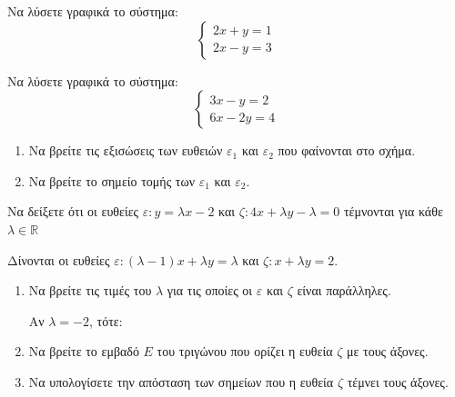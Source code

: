 \documentclass{presentation}
\begin{document}
\begin{askisi}
  Να λύσετε γραφικά το σύστημα: $$\begin{cases} 2x+y=1 \\ 2x-y=3 \end{cases}$$
\end{askisi}

\begin{askisi}
  Να λύσετε γραφικά το σύστημα: $$\begin{cases} 3x-y=2 \\ 6x-2y=4 \end{cases}$$
\end{askisi}

\begin{askisi}
  \begin{enumerate}
    \item Να βρείτε τις εξισώσεις των ευθειών $ε_1$ και $ε_2$ που φαίνονται στο σχήμα.
    \item Να βρείτε το σημείο τομής των $ε_1$ και $ε_2$.
  \end{enumerate}
\end{askisi}

\begin{askisi}
  Να δείξετε ότι οι ευθείες $ε:y=λx-2$ και $ζ:4x+λy-λ=0$ τέμνονται για κάθε $λ\in\mathbb{R}$
\end{askisi}

\begin{askisi}
  Δίνονται οι ευθείες $ε:(λ-1)x+λy=λ$ και $ζ:x+λy=2$.
  \begin{enumerate}[<+->]
    \item Να βρείτε τις τιμές του $λ$ για τις οποίες οι $ε$ και $ζ$ είναι παράλληλες.

          Αν $λ=-2$, τότε:
    \item Να βρείτε το εμβαδό $Ε$ του τριγώνου που ορίζει η ευθεία $ζ$ με τους άξονες.
    \item Να υπολογίσετε την απόσταση των σημείων που η ευθεία $ζ$ τέμνει τους άξονες.
  \end{enumerate}
\end{askisi}

\moodle
\end{document}
